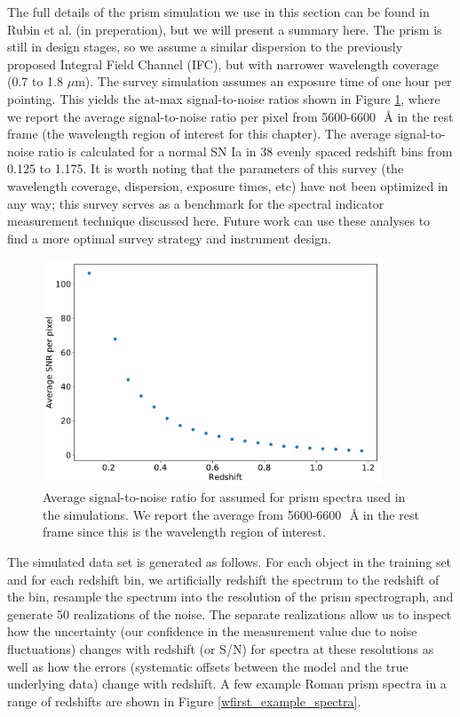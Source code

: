 The full details of the prism simulation we use in this section can be found in Rubin et al. (in preperation), but we will present a summary here. The prism is still in design stages, so we assume a similar dispersion to the previously proposed Integral Field Channel (IFC), but with narrower wavelength coverage (0.7 to 1.8 $\mu$m). The survey simulation assumes an exposure time of one hour per pointing. This yields the at-max signal-to-noise ratios shown in Figure \ref{snr_wfirst_prism}, where we report the average signal-to-noise ratio per pixel from 5600-6600~\,\AA{} in the rest frame (the wavelength region of interest for this chapter). The average signal-to-noise ratio is calculated for a normal SN Ia in 38 evenly spaced redshift bins from 0.125 to 1.175. It is worth noting that the parameters of this survey (the wavelength coverage, dispersion, exposure times, etc) have not been optimized in any way; this survey serves as a benchmark for the spectral indicator measurement technique discussed here. Future work can use these analyses to find a more optimal survey strategy and instrument design.

\begin{figure}[htbp]
    \centering
    \includegraphics[width=0.9\textwidth]{figures/si_feat_pca/wfirst_snr_vs_redshift.pdf}
    \caption{Average signal-to-noise ratio for assumed for prism spectra used in the simulations. We report the average from 5600-6600~\,\AA{} in the rest frame since this is the wavelength region of interest.}
    \label{snr_wfirst_prism}
\end{figure}

The simulated data set is generated as follows. For each object in the training set and for each redshift bin, we artificially redshift the spectrum to the redshift of the bin, resample the spectrum into the resolution of the prism spectrograph, and generate 50 realizations of the noise. The separate realizations allow us to inspect how the uncertainty (our confidence in the measurement value due to noise fluctuations) changes with redshift (or S/N) for spectra at these resolutions as well as how the errors (systematic offsets between the model and the true underlying data) change with redshift. A few example Roman prism spectra in a range of redshifts are shown in Figure \ref{wfirst_example_spectra}.

